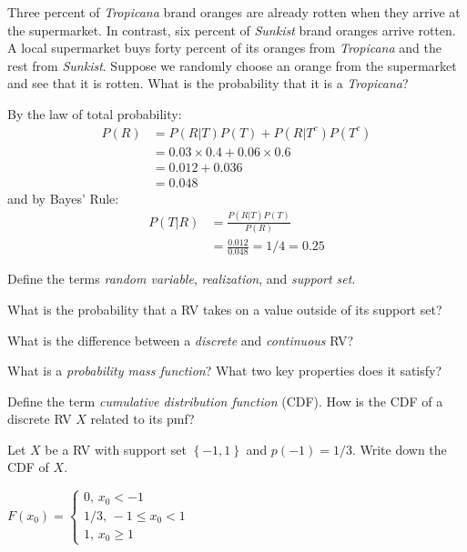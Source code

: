 \documentclass[addpoints,12pt]{exam}
\begin{document}
\begin{questions}
\question Three percent of \emph{Tropicana} brand oranges are already rotten when they arrive at the supermarket. In contrast, six percent of \emph{Sunkist} brand oranges arrive rotten. A local supermarket buys forty percent of its oranges from \emph{Tropicana} and the rest from \emph{Sunkist}. 
		Suppose we randomly choose an orange from the supermarket and see that it is rotten. What is the probability that it is a \emph{Tropicana}?
		\begin{solution}
			By the law of total probability:
				\begin{align*}
				P(R) &= P(R|T)P(T) + P(R|T^c)P(T^c)\\
					&= 0.03 \times 0.4 + 0.06 \times 0.6\\
					&= 0.012 + 0.036 \\
					&= 0.048
				\end{align*}
		 and by Bayes' Rule:
			\begin{align*}
			P(T|R) &= \frac{P(R|T)P(T)}{P(R)}\\
					&= \frac{0.012}{0.048} = 1/4 = 0.25
			\end{align*}
		\end{solution}

\question Define the terms \emph{random variable}, \emph{realization}, and \emph{support set}.

\question What is the probability that a RV takes on a value outside of its support set?

\question What is the difference between a \emph{discrete} and \emph{continuous} RV? 

\question What is a \emph{probability mass function}? What two key properties does it satisfy?

%

\question Define the term \emph{cumulative distribution function} (CDF).
How is the CDF of a discrete RV $X$ related to its pmf?

\question Let $X$ be a RV with support set $\left\{-1, 1 \right\}$ and $p(-1) = 1/3$.
Write down the CDF of $X$. 
\begin{solution}
$F(x_0) = \left\{\begin{array}{l} 0,\, x_0 < -1 \\ 1/3, \, -1 \leq x_0 < 1\\ 1,\, x_0 \geq 1\end{array} \right.$
\end{solution}


\end{questions}
\end{document}
